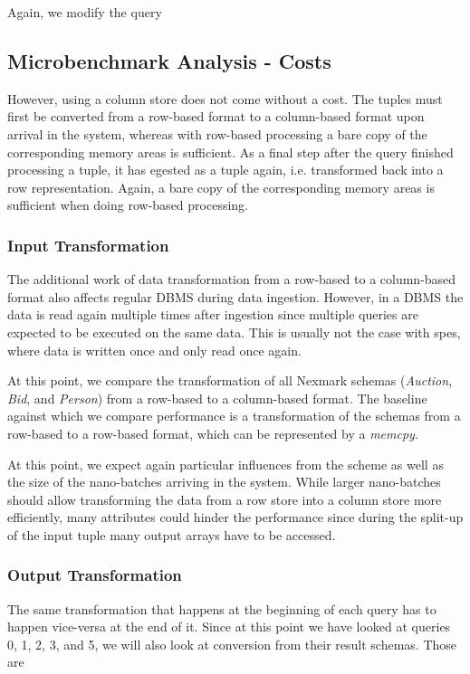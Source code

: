 Again, we modify the query 
\subsection{Microbenchmark Analysis - Costs}

However, using a column store does not come without a cost.
The tuples must first be converted from a row-based format to a column-based format upon arrival in the system, whereas with row-based processing a bare copy of the corresponding memory areas is sufficient.
As a final step after the query finished processing a tuple, it has egested as a tuple again, i.e. transformed back into a row representation.
Again, a bare copy of the corresponding memory areas is sufficient when doing row-based processing.

\subsubsection{Input Transformation}
The additional work of data transformation from a row-based to a column-based format also affects regular DBMS during data ingestion.
However, in a DBMS the data is read again multiple times after ingestion since multiple queries are expected to be executed on the same data.
This is usually not the case with \acp{spe}, where data is written once and only read once again.

At this point, we compare the transformation of all Nexmark schemas (\emph{Auction}, \emph{Bid}, and \emph{Person}) from a row-based to a column-based format.
The baseline against which we compare performance is a transformation of the schemas from a row-based to a row-based format, which can be represented by a \emph{memcpy}.


At this point, we expect again particular influences from the scheme as well as the size of the nano-batches arriving in the system.
While larger nano-batches should allow transforming the data from a row store into a column store more efficiently, many attributes could hinder the performance since during the split-up of the input tuple many output arrays have to be accessed.

\subsubsection{Output Transformation}

The same transformation that happens at the beginning of each query has to happen vice-versa at the end of it.
Since at this point we have looked at queries 0, 1, 2, 3, and 5, we will also look at conversion from their result schemas.
Those are

